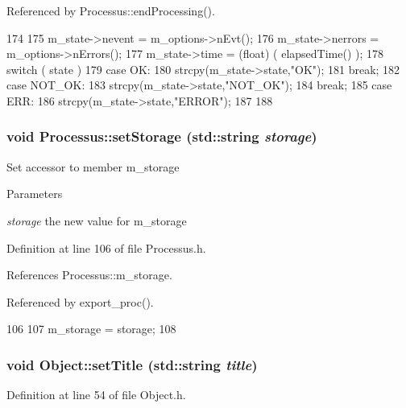 Referenced by Processus::endProcessing().


\begin{DoxyCode}
174                                      {
175   m_state->nevent  = m_options->nEvt();
176   m_state->nerrors = m_options->nErrors();
177   m_state->time    = (float) ( elapsedTime() );
178   switch ( state ){
179   case OK:
180     strcpy(m_state->state,"OK");
181     break;
182   case NOT_OK:
183     strcpy(m_state->state,"NOT_OK");
184     break;
185   case ERR:
186     strcpy(m_state->state,"ERROR");
187   }
188 }
\end{DoxyCode}
\hypertarget{classProcessus_ad57a29b33f9021eda9f6929136f1784f}{
\subsubsection[{setStorage}]{\setlength{\rightskip}{0pt plus 5cm}void Processus::setStorage (std::string {\em storage})}}
\label{classProcessus_ad57a29b33f9021eda9f6929136f1784f}
Set accessor to member m\_\-storage 
\begin{DoxyParams}{Parameters}
\item[{\em storage}]the new value for m\_\-storage \end{DoxyParams}


Definition at line 106 of file Processus.h.

References Processus::m\_\-storage.

Referenced by export\_\-proc().


\begin{DoxyCode}
106                                       {
107     m_storage = storage;
108   }
\end{DoxyCode}
\hypertarget{classObject_a89557dbbad5bcaa02652f5d7fa35d20f}{
\subsubsection[{setTitle}]{\setlength{\rightskip}{0pt plus 5cm}void Object::setTitle (std::string {\em title})}}
\label{classObject_a89557dbbad5bcaa02652f5d7fa35d20f}


Definition at line 54 of file Object.h.

